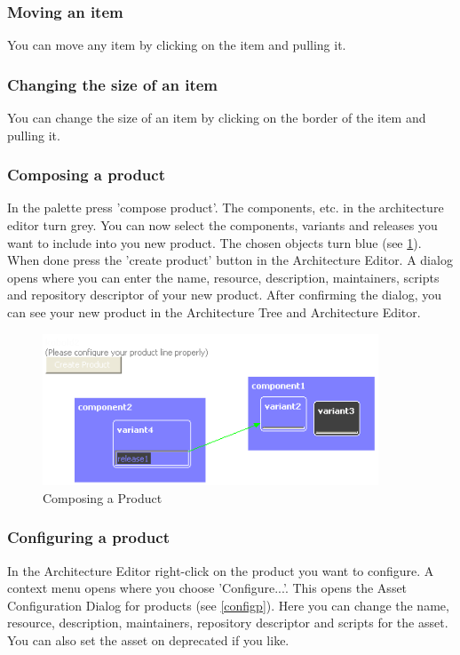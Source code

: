 \subsubsection{Moving an item}
You can move any item by clicking on the item and pulling it.

\subsubsection{Changing the size of an item}
You can change the size of an item by clicking on the border of the item and pulling it.


\subsubsection{Composing a product}

In the palette press 'compose product'. The components, etc. in the architecture editor turn
grey. You can now select the components, variants and releases you want to include into
you new product. The chosen objects turn blue (see \ref{compose}). When done press the 
'create product' button in the Architecture Editor. A dialog opens where you can enter
the name, resource, description, maintainers, scripts and repository descriptor of your new product. After confirming the dialog, you can see
your new product in the Architecture Tree and Architecture Editor.

\begin{figure}[h!]
\begin{center}
\includegraphics[width=10cm]{composeproduct.png}
   \caption{Composing a Product}
\label{compose}
\end{center}
\end{figure}\par

\subsubsection{Configuring a product}
In the Architecture Editor right-click on the product you want to configure. 
A context menu opens where you choose 'Configure...'. This opens the Asset Configuration Dialog
for products (see \ref{configp}). Here you can change the name, resource, description, maintainers, repository descriptor and scripts for the
asset. You can also set the asset on deprecated if you like.

